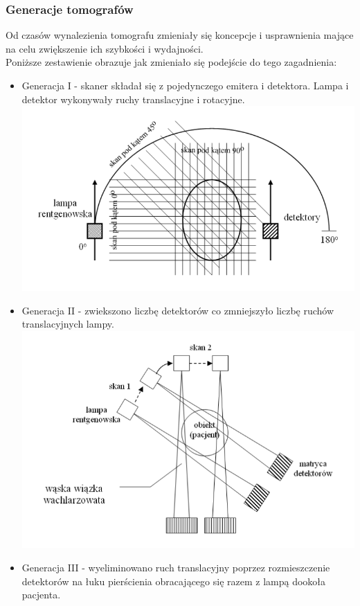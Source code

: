 \documentclass[A_4paper,12pt]{article}
\begin{document}
\subsubsection{Generacje tomografów}
Od czasów wynalezienia tomografu zmieniały się koncepcje i usprawnienia mające na celu zwiększenie ich szybkości i wydajności. \\
Poniższe zestawienie obrazuje jak zmieniało się podejście do tego zagadnienia:
\begin{itemize}
\item Generacja I - skaner składał się z pojedynczego emitera i detektora. Lampa i detektor wykonywały ruchy translacyjne i rotacyjne. \\
\includegraphics[scale=0.5]{1gen.png}
\item Generacja II - zwiekszono liczbę detektorów co zmniejszyło liczbę ruchów translacyjnych lampy. \\
\includegraphics[scale=0.5]{2gen.png}
\item Generacja III - wyeliminowano ruch translacyjny poprzez rozmieszczenie detektorów na łuku pierścienia obracającego się razem z lampą dookoła pacjenta. \\

\end{itemize}
\end{document}
